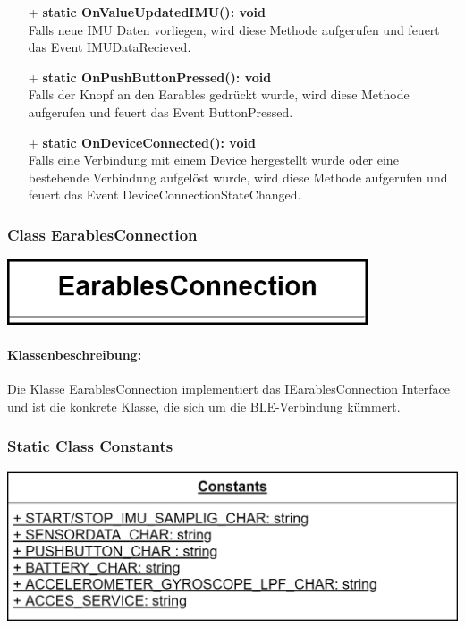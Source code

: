 \documentclass[a4paper,12pt]{article}
\begin{document}
\begin{itemize}
	\item[+] \textbf{static OnValueUpdatedIMU(): void}\\ Falls neue IMU Daten vorliegen, wird diese Methode aufgerufen und feuert das Event IMUDataRecieved.
	\item[+] \textbf{static OnPushButtonPressed(): void}\\ Falls der Knopf an den \Gls{Earables} gedrückt wurde, wird diese Methode aufgerufen und feuert das Event ButtonPressed.
	\item[+] \textbf{static OnDeviceConnected(): void}\\ Falls eine Verbindung mit einem Device hergestellt wurde oder eine bestehende Verbindung aufgelöst wurde, wird diese Methode aufgerufen und feuert das Event DeviceConnectionStateChanged.
\end{itemize}

\begin{minipage}[b]{0.5\textwidth}
	\subsubsection{Class EarablesConnection}
	
	\end{minipage}
	\begin{minipage}[c]{0.5\textwidth}
	\includegraphics[width=0.8\textwidth]{bilder/BibPackageKlassen/EarablesConnection.png}
\end{minipage}

\paragraph{Klassenbeschreibung:}
Die Klasse EarablesConnection implementiert das IEarablesConnection Interface und ist die konkrete Klasse, die sich um die BLE-Verbindung kümmert.\\

\begin{minipage}[b]{0.5\textwidth}
	\subsubsection{Static Class Constants}
	
	\end{minipage}
	\begin{minipage}[c]{0.5\textwidth}
	\includegraphics[width=1.4\textwidth]{bilder/BibPackageKlassen/Constants.png}
\end{minipage}
\end{document}

